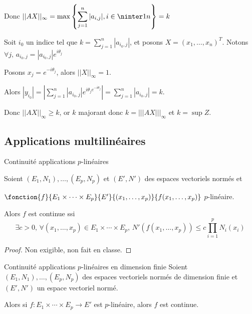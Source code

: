 Donc $\displaystyle ||AX||_\infty = \max \left\{ \sum_{j = 1 }^{n } |a_{i, j}|, i \in \ninter 1 n  \right\} = k$

Soit $i_0$ un indice tel que $k = \sum_{j=1}^n |a_{i_0, j}|$, et posons 
$X = (x_1, \ldots, x_n)^T$. Notons $\forall j, \, a_{i_0, j} = |a_{i_0, j}| e^{i \theta_j}$ 

Posons $x_j = e^{-i \theta_j}$, alors $||X||_\infty = 1$.

Alors $|y_{i_0}| = \left|\sum_{j = 1 }^{n } | a_{i_0, j} | e^{i \theta_j e^{-i \theta_j}}\right| = \sum_{j=1}^n |a_{i_0, j}| = k$.

Donc $|| AX||_\infty \geqslant k$, or $k$ majorant donc $k = |||AX |||_\infty$ et $k = \sup Z$. 


\subsection{Applications multilinéaires}

\begin{theoreme}{Continuité applications $p$-linéaires}{}

    Soient $(E_1, N_1), \ldots, (E_p, N_p)$ et $(E', N')$ des espaces vectoriels normés et 
    
    $\fonction{f}{E_1 \times \cdots \times E_p}{E'}{(x_1, \ldots, x_p)}{f(x_1, \ldots, x_p)}$ 
    $p$-linéaire. 

    Alors $f$ est continue ssi $$\exists c > 0, \, \forall (x_1, \ldots, x_p) \in E_1 \times \cdots \times E_p, \, N'(f(x_1, \ldots, x_p)) \leqslant c \prod_{i=1}^p N_i(x_i)$$
\end{theoreme}

\begin{proof}
    Non exigible, non fait en classe.
\end{proof}

\begin{proposition}{Continuité applications $p$-linéaires en dimension finie}{}
    Soient $(E_1, N_1), \ldots, (E_p, N_p)$ des espaces vectoriels normés de dimension finie et $(E', N')$ un espace vectoriel normé.

    Alors si $f : E_1 \times \cdots \times E_p \to E'$ est $p$-linéaire, alors $f$ est continue.
\end{proposition}

